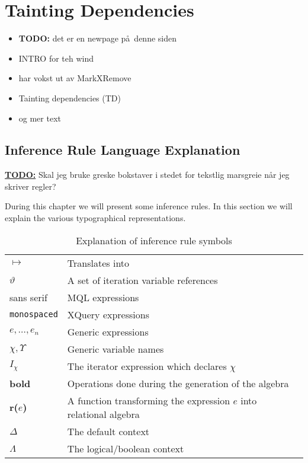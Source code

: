 \newpage
\section{Tainting Dependencies}
\label{sect:trans:taintingDependencies}

\begin{itemize}
  \item \textbf{\LARGE TODO:} det er en newpage p\aa~denne siden
  \item INTRO for teh wind
  \item har vokst ut av MarkXRemove
  \item Tainting dependencies (TD)
  \item og mer text
\end{itemize}

\subsection{Inference Rule Language Explanation}
\label{sect:trans:TD:langExpl}
\underline{\textbf{\LARGE TODO:}} Skal jeg bruke greske bokstaver i stedet for tekstlig marsgreie n\aa r jeg
skriver regler?

During this chapter we will present some inference rules. In this section we will explain the various
typographical representations.

\begin{table}[h]
\begin{tabular}{l|l}

  $\longmapsto$  			& Translates into \\
  $\vartheta$ 			& A set of iteration variable references \\
  \textsf{sans serif} 	& MQL expressions \\
  \texttt{monospaced} 	& XQuery expressions \\
  $e,\ldots,e_{n}$		  	& Generic expressions \\
  $\chi, \Upsilon$		& Generic variable names \\
  $I_{\chi}$			& The iterator expression which declares $\chi$ \\
  \textbf{bold} 		& Operations done during the generation of the algebra \\
  \textbf{r(}$e$\textbf{)} & A function transforming the expression $e$ into relational algebra \\
  $\Delta$ 				& The default context \\
  $\Lambda$ 			& The logical/boolean context \\
  
\end{tabular}
\caption{Explanation of inference rule symbols}
\label{tab:trans:td:langExpl}
\end{table}

